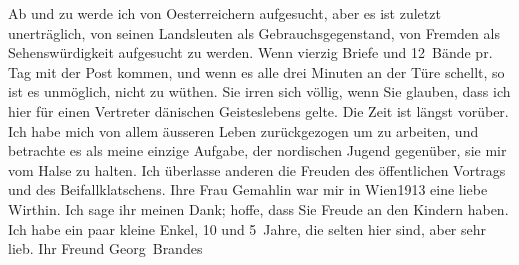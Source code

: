 \begin{ledgroupsized}[t]{13cm}
           \pstart
           Ab und zu werde ich von Oesterreichern
               aufgesucht, aber es ist zuletzt unerträglich, von seinen Landsleuten als
               Gebrauchsgegenstand, {\pb}von Fremden
               als Sehenswürdigkeit aufgesucht zu werden. Wenn vierzig Briefe und 12 Bände pr. Tag
                   mit der Post \introOben{}kommen,\introOben{} und wenn es alle drei Minuten an der Türe schellt, so ist es
               unmöglich, nicht zu wüthen.\pend
           \pstart
           Sie irren sich völlig, wenn Sie glauben, dass ich hier für einen Vertreter dänischen Geisteslebens gelte. Die Zeit ist
               längst vorüber. Ich habe mich von allem äusseren Leben zurückgezogen um zu arbeiten,
               und betrachte es als meine einzige Aufgabe, der nordischen Jugend gegenüber, sie mir vom Halse zu halten. Ich überlasse
               anderen die Freuden des öffentlichen Vortrags und des Beifallklatschens.\pend
           \pstart
           Ihre Frau Gemahlin war mir in
                  Wien1913 eine liebe Wirthin. Ich sage ihr meinen Dank; hoffe, dass Sie
               Freude an den Kindern haben. Ich habe ein paar kleine Enkel, 10 und 5 Jahre, die selten hier sind, aber sehr lieb.\pend
           \pstart Ihr Freund \spacefill\mbox{Georg Brandes}\pend{}
         
         \endnumbering{}\end{ledgroupsized}  \newcommand{\dateiname}{L02303}\newcommand{\titel}{Georg Brandes an Arthur Schnitzler, 18. 9. 1918}\newcommand{\editorInnen}{Martin Anton Müller und Gerd-Hermann Susen}
      